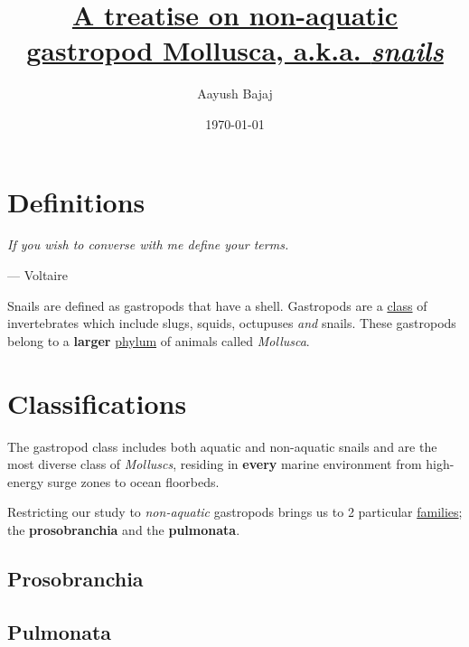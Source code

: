 \documentclass[10pt]{article}
\begin{document}
\title{\underline{A treatise on non-aquatic gastropod Mollusca, a.k.a. \emph{snails}}}
\author{Aayush Bajaj}
\date{\today}
\maketitle

\tableofcontents

\dotfill
\bigbreak

\section*{Definitions}

    \begin{flushright}
    \begin{minipage}{8cm}
        \begin{flushleft} \emph{If you wish to converse with me define your terms.} \end{flushleft}
        \begin{flushright}--- Voltaire\end{flushright}
    \end{minipage}
    \end{flushright}

    Snails are defined as gastropods that have a shell. Gastropods are a \underline{class} of invertebrates which include slugs, squids, octupuses \emph{and} snails. These gastropods belong to a \textbf{larger} \underline{phylum} of animals called \emph{Mollusca}.

\section*{Classifications}

    The gastropod class includes both aquatic and non-aquatic snails and are the most diverse class of \emph{Molluscs}, residing in \textbf{every} marine environment from high-energy surge zones to ocean floorbeds.

    Restricting our study to \emph{non-aquatic} gastropods brings us to 2 particular \underline{families}; the \textbf{prosobranchia} and the \textbf{pulmonata}.

    \subsection*{Prosobranchia}
        
    \subsection*{Pulmonata}
\end{document}
